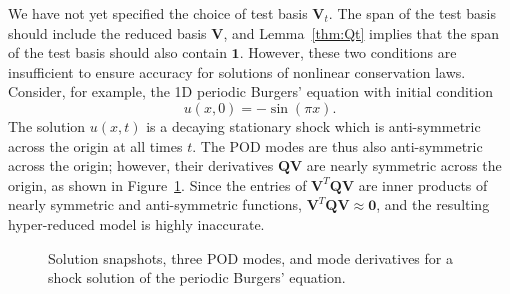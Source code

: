 \documentclass[preprint,10pt]{elsarticle}
\theoremstyle{definition}
\theoremstyle{lemma}
\theoremstyle{theorem}
\theoremstyle{assumption}
\begin{document}
We have not yet specified the choice of test basis $\bm{V}_t$.  The span of the test basis should include the reduced basis $\bm{V}$, and Lemma~\ref{thm:Qt} implies that the span of the test basis should also contain $\bm{1}$.  However, these two conditions are insufficient to ensure accuracy for solutions of nonlinear conservation laws.  Consider, for example, the 1D periodic Burgers' equation with initial condition 
\[
u(x,0) = -\sin(\pi x).
\]
The solution $u(x,t)$ is a decaying stationary shock which is anti-symmetric across the origin at all times $t$.  The POD modes are thus also anti-symmetric across the origin; however, their derivatives $\bm{Q}\bm{V}$ are nearly symmetric across the origin, as shown in Figure~\ref{fig:modeQ}.  Since the entries of $\bm{V}^T\bm{Q}\bm{V}$ are inner products of nearly symmetric and anti-symmetric functions, $\bm{V}^T\bm{Q}\bm{V} \approx \bm{0}$, and the resulting hyper-reduced model is highly inaccurate.
\begin{figure}[!h]
\centering
{}
\hspace{.1em}
\hspace{.1em}
\caption{Solution snapshots, three POD modes, and mode derivatives for a shock solution of the periodic Burgers' equation. }
\label{fig:modeQ}
\end{figure}
\end{document}
